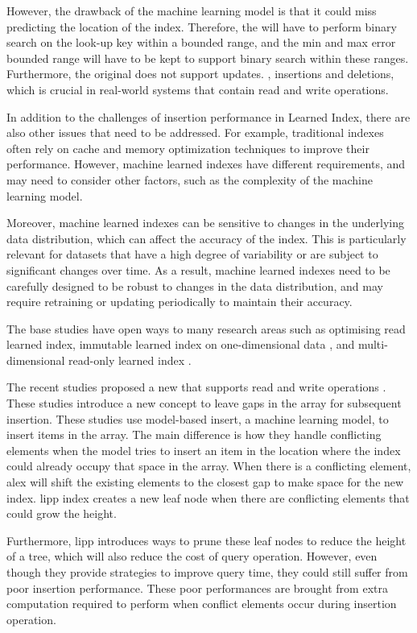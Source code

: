 However, the drawback of the machine learning model is that it could miss predicting the location of the index. Therefore, the \learnindex will have to perform binary search on the look-up key within a bounded range, and the min and max error bounded range will have to be kept to support binary search within these ranges. Furthermore, the original \learnindex does not support updates. \ie, insertions and deletions, which is crucial in real-world systems that contain read and write operations.

In addition to the challenges of insertion performance in Learned Index, there are also other issues that need to be addressed. For example, traditional \btree indexes often rely on cache and memory optimization techniques to improve their performance. However, machine learned indexes have different requirements, and may need to consider other factors, such as the complexity of the machine learning model.

Moreover, machine learned indexes can be sensitive to changes in the underlying data distribution, which can affect the accuracy of the index. This is particularly relevant for datasets that have a high degree of variability or are subject to significant changes over time. As a result, machine learned indexes need to be carefully designed to be robust to changes in the data distribution, and may require retraining or updating periodically to maintain their accuracy.

The base \learnindex studies have open ways to many research areas such as optimising read learned index, immutable learned index on one-dimensional data \cite{ALEX, PGM, LIPP}, and multi-dimensional read-only learned index \cite{FloodLMD, Tsunami}.

The recent studies proposed a new \learnindex that supports read and write operations \cite{ALEX,fittingtree,LIPP,PGM}. These studies introduce a new concept to leave gaps in the array for subsequent insertion. These studies use model-based insert, a machine learning model, to insert items in the array. The main difference is how they handle conflicting elements when the model tries to insert an item in the location where the index could already occupy that space in the array. When there is a conflicting element, \acrfull{alex} will shift the existing elements to the closest gap to make space for the new index. \acrfull{lipp} index creates a new leaf node when there are conflicting elements that could grow the height.

Furthermore, \acrshort{lipp} introduces ways to prune these leaf nodes to reduce the height of a tree, which will also reduce the cost of query operation. However, even though they provide strategies to improve query time, they could still suffer from poor insertion performance. These poor performances are brought from extra computation required to perform when conflict elements occur during insertion operation. 

